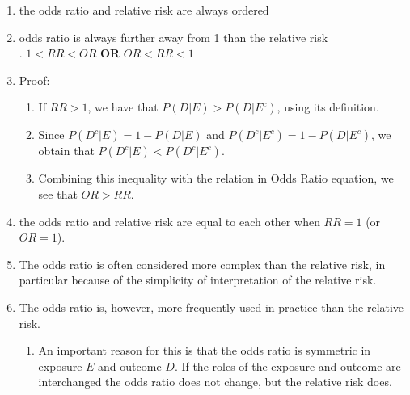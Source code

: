 \begin{enumerate}
    \item the odds ratio and relative risk are always ordered
    \hfill \cite{statistics/book/Statistics-for-Data-Scientists/Maurits-Kaptein}

    \item odds ratio is always further away from 1 than the relative risk
    \hfill \cite{statistics/book/Statistics-for-Data-Scientists/Maurits-Kaptein}
    \\
    .\hfill
    $1 < RR < OR$
    \hfill \textbf{OR} \hfill
    $OR < RR < 1$
    \hfill \cite{statistics/book/Statistics-for-Data-Scientists/Maurits-Kaptein}

    \item Proof:
    \begin{enumerate}
        \item  If $RR > 1$, we have that $P(D|E) > P(D|E^c)$, using its definition.
        \hfill \cite{statistics/book/Statistics-for-Data-Scientists/Maurits-Kaptein}

        \item Since $P(D^c|E) = 1 - P(D|E)$ and $P(D^c|E^c) = 1 - P(D|E^c)$, we obtain that $P(D^c|E) < P(D^c|E^c)$.
        \hfill \cite{statistics/book/Statistics-for-Data-Scientists/Maurits-Kaptein}

        \item Combining this inequality with the relation in Odds Ratio equation, we see that $OR > RR$.
        \hfill \cite{statistics/book/Statistics-for-Data-Scientists/Maurits-Kaptein}

    \end{enumerate}

    \item the odds ratio and relative risk are equal to each other when $RR = 1$ (or $OR = 1$).
    \hfill \cite{statistics/book/Statistics-for-Data-Scientists/Maurits-Kaptein}

    \item The odds ratio is often considered more complex than the relative risk, in particular because of the simplicity of interpretation of the relative risk.
    \hfill \cite{statistics/book/Statistics-for-Data-Scientists/Maurits-Kaptein}

    \item The odds ratio is, however, more frequently used in practice than the relative risk.
    \hfill \cite{statistics/book/Statistics-for-Data-Scientists/Maurits-Kaptein}
    \begin{enumerate}
        \item An important reason for this is that the odds ratio is symmetric in exposure $E$ and outcome $D$.
        If the roles of the exposure and outcome are interchanged the odds ratio does not change, but the relative risk does.
        \hfill \cite{statistics/book/Statistics-for-Data-Scientists/Maurits-Kaptein}

    \end{enumerate}
\end{enumerate}
